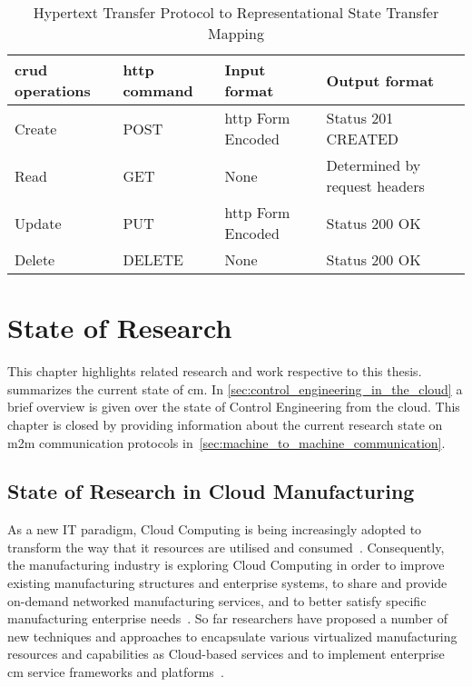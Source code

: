 \documentclass[
a4paper,
twoside,
headsepline,
cleardoublepage=empty,
parskip=half,
draft=false
]{scrbook}
\begin{document}
			\begin{table}[hbtp]
				\centering
				\caption{Hypertext Transfer Protocol to Representational State Transfer Mapping}
				\label{tab:http_rest_mapping}
				\begin{tabular}{@{}llll@{}}
					\toprule
					\gls{crud} operations & \gls{http} command & Input format & Output format
					\\ \midrule
					Create & POST & \gls{http} Form Encoded & Status 201 CREATED
					\\ \midrule
					Read & GET & None & Determined by request headers 
					\\ \midrule
					Update & PUT & \gls{http} Form Encoded & Status 200 OK
					\\ \midrule
					Delete & DELETE & None & Status 200 OK
					\\ \bottomrule
				\end{tabular}
			\end{table}

	\chapter{State of Research} \label{ch:state_of_the_Science}

		This chapter highlights related research and work respective to this thesis.  summarizes the current state of \gls{cm}. In \cref{sec:control_engineering_in_the_cloud} a brief overview is given over the state of Control Engineering from the cloud. This chapter is closed by providing information about the current research state on \gls{m2m} communication protocols in~\cref{sec:machine_to_machine_communication}.

		\section{State of Research in Cloud Manufacturing}\label{sec:state_of_science_cloud_manufacturing}

			As a new IT paradigm, Cloud Computing is being increasingly adopted to transform the way that \gls{it} resources are utilised and consumed~\cite{li2010cloud}. 
			Consequently, the manufacturing industry is exploring Cloud Computing in order to improve existing manufacturing structures and enterprise systems, to
			share and provide on-demand networked manufacturing services, and to better satisfy specific manufacturing enterprise needs~\cite{he2015state}.
			So far researchers have proposed a number of new techniques and approaches to encapsulate various virtualized manufacturing resources and capabilities as Cloud-based services and to implement enterprise \gls{cm} service frameworks and platforms~\cite{tao2011cloud}.
			
\end{document}
